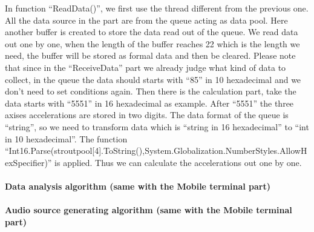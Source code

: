 In function ``ReadData()'', we first use the thread different from the previous
one. All the data source in the part are from the queue acting as data pool.
Here another buffer is created to store the data read out of the queue. We read
data out one by one, when the length of the buffer reaches 22 which is the
length we need, the buffer will be stored as formal data and then be cleared.
Please note that since in the “ReceiveData” part we already judge what kind of
data to collect, in the queue the data should starts with “85” in 10 hexadecimal
and we don’t need to set conditions again. Then there is the calculation part,
take the data starts with “5551” in 16 hexadecimal as example. After “5551” the
three axises accelerations are stored in two digits. The data format of the
queue is “string”, so we need to transform data which is “string in 16
hexadecimal” to “int in 10 hexadecimal”. The function
“Int16.Parse(stroutpool[4].ToString(),System.Globalization.NumberStyles.AllowHexSpecifier)” 
is applied. Thus we can calculate the accelerations out one by one.

\paragraph{Data analysis algorithm (same with the Mobile terminal part)}

\paragraph{Audio source generating algorithm (same with the Mobile terminal
  part)} 

